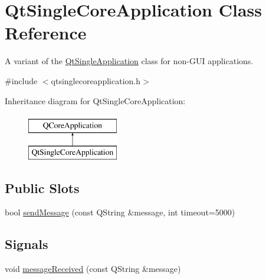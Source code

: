 \hypertarget{class_qt_single_core_application}{}\section{Qt\+Single\+Core\+Application Class Reference}
\label{class_qt_single_core_application}


A variant of the \hyperlink{class_qt_single_application}{Qt\+Single\+Application} class for non-\/\+G\+UI applications.  




{\ttfamily \#include $<$qtsinglecoreapplication.\+h$>$}

Inheritance diagram for Qt\+Single\+Core\+Application\+:\begin{figure}[H]
\begin{center}
\leavevmode
\includegraphics[height=2.000000cm]{class_qt_single_core_application}
\end{center}
\end{figure}
\subsection*{Public Slots}
\begin{DoxyCompactItemize}
\item 
bool \hyperlink{class_qt_single_core_application_a07493d0807b216ca870adc6d40f856b0}{send\+Message} (const Q\+String \&message, int timeout=5000)
\end{DoxyCompactItemize}
\subsection*{Signals}
\begin{DoxyCompactItemize}
\item 
void \hyperlink{class_qt_single_core_application_a1af66a1770ff5eec8006a26a2ce42ca1}{message\+Received} (const Q\+String \&message)
\end{DoxyCompactItemize}
